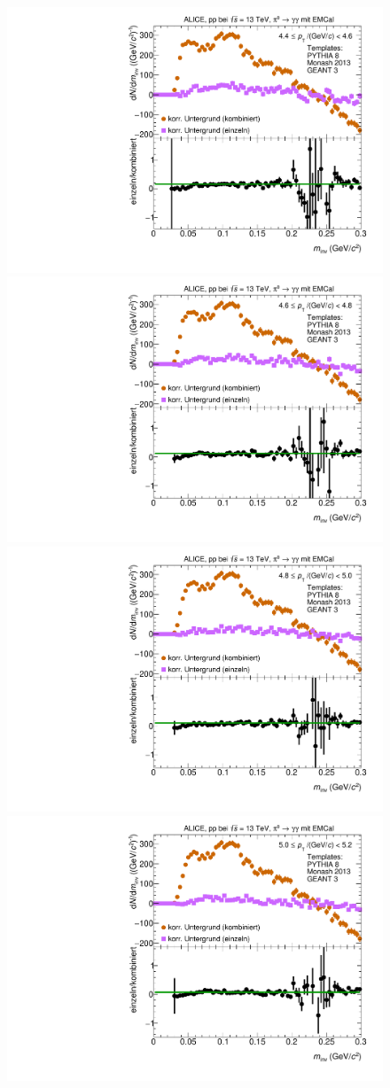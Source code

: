 \begin{figure}[t]
\centering
\begin{multicols}{2}
    \includegraphics[width=.65\linewidth]{Anhang/BackgroundWithRatio16_Data_2016.pdf}\par 
    \includegraphics[width=.65\linewidth]{Anhang/BackgroundWithRatio17_Data_2016.pdf}\par 
\end{multicols}
\begin{multicols}{2}
    \includegraphics[width=.65\linewidth]{Anhang/BackgroundWithRatio18_Data_2016.pdf}\par
    \includegraphics[width=.65\linewidth]{Anhang/BackgroundWithRatio19_Data_2016.pdf}\par

\end{multicols}
\end{figure}
